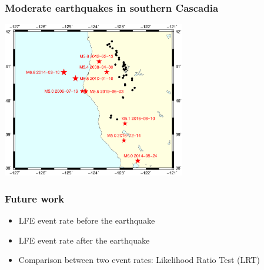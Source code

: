 \documentclass{beamer}
\begin{document}
	\begin{frame}
		\frametitle{Moderate earthquakes in southern Cascadia}
		\begin{center}
			\includegraphics[trim={1cm 4cm 1cm 10cm}, clip, width=8cm]{catalog_SC/earthquakes_map.eps}
		\end{center}
	\end{frame}

	\begin{frame}
		\frametitle{Future work}
		\begin{itemize}
			\item LFE event rate before the earthquake
			\item LFE event rate after the earthquake
			\item Comparison between two event rates: Likelihood Ratio Test (LRT)
		\end{itemize}
	\end{frame}

\end{document}
